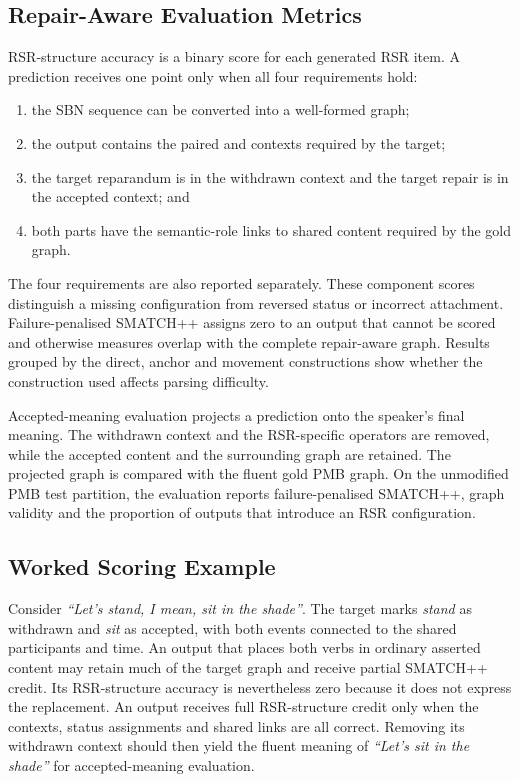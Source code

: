 \subsection{Repair-Aware Evaluation Metrics}
\label{app:model-metrics}

RSR-structure accuracy is a binary score for each generated RSR item. A
prediction receives one point only when all four requirements hold:

\begin{enumerate}[nosep]
  \item the SBN sequence can be converted into a well-formed graph;
  \item the output contains the paired  and
         contexts required by the target;
  \item the target reparandum is in the withdrawn context and the target repair
        is in the accepted context; and
  \item both parts have the semantic-role links to shared content required by
        the gold graph.
\end{enumerate}

The four requirements are also reported separately. These component scores
distinguish a missing configuration from reversed status or incorrect
attachment. Failure-penalised SMATCH++ assigns zero to an output that cannot be
scored and otherwise measures overlap with the complete repair-aware graph.
Results grouped by the direct, anchor and movement constructions show whether
the construction used affects parsing difficulty.

Accepted-meaning evaluation projects a prediction onto the speaker's final
meaning. The withdrawn context and the RSR-specific operators are removed, while
the accepted content and the surrounding graph are retained. The projected
graph is compared with the fluent gold PMB graph. On the unmodified PMB
test partition, the evaluation reports failure-penalised SMATCH++, graph
validity and the proportion of outputs that introduce an RSR configuration.

\subsection{Worked Scoring Example}
\label{app:model-scoring}

Consider \textit{``Let's stand, I mean, sit in the shade''}. The target marks
\textit{stand} as withdrawn and \textit{sit} as accepted, with both events
connected to the shared participants and time. An output that places both
verbs in ordinary asserted content may retain much of the target graph and
receive partial SMATCH++ credit. Its RSR-structure accuracy is nevertheless
zero because it does not express the replacement. An output receives full
RSR-structure credit only when the contexts, status assignments and shared
links are all correct. Removing its withdrawn context should then yield the
fluent meaning of \textit{``Let's sit in the shade''} for accepted-meaning
evaluation.

